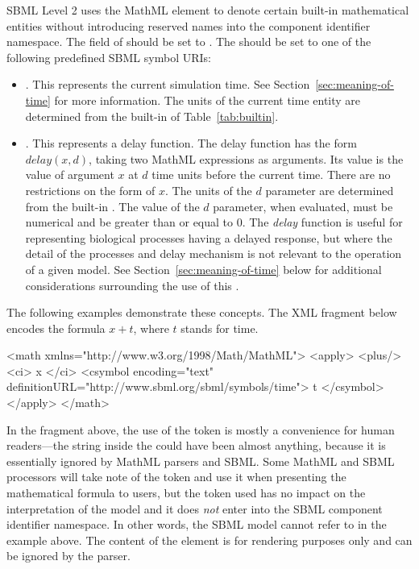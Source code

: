 SBML Level 2 uses the MathML  element to denote
certain built-in mathematical entities without introducing
reserved names into the component identifier namespace.  The
 field of  should be set to
.  The  should be set to one of the
following predefined SBML symbol URIs:
\begin{itemize}

\item {}.  This
  represents the current simulation time.  See
  Section~\ref{sec:meaning-of-time} for more information.  The
  units of the current time entity are determined from the
  built-in  of Table~\vref{tab:builtin}.

\item {}.  This
  represents a delay function.  The delay function has the form
  $delay(x, d)$, taking two MathML expressions as arguments.  Its
  value is the value of argument $x$ at $d$ time units before the
  current time.  There are no restrictions on the form of $x$.
  The units of the $d$ parameter are determined from the built-in
  .  The value of the $d$ parameter, when evaluated,
  must be numerical and be greater than or equal to 0.  The
  \emph{delay} function is useful for representing biological
  processes having a delayed response, but where the detail of the
  processes and delay mechanism is not relevant to the operation
  of a given model.  See Section~\ref{sec:meaning-of-time} below
  for additional considerations surrounding the use of this
  .

\end{itemize}

The following examples demonstrate these concepts.  The XML fragment below
encodes the formula $x + t$, where $t$ stands for time.

\begin{example}
<math xmlns="http://www.w3.org/1998/Math/MathML">
    <apply>
        <plus/>
        <ci> x </ci>
        <csymbol encoding="text" definitionURL="http://www.sbml.org/sbml/symbols/time">
            t
        </csymbol>
    </apply>
</math>
\end{example}

In the fragment above, the use of the token  is mostly a
convenience for human readers---the string inside the
 could have been almost anything, because it is
essentially ignored by MathML parsers and SBML.  Some MathML and
SBML processors will take note of the token and use it when
presenting the mathematical formula to users, but the token used
has no impact on the interpretation of the model and it does
\emph{not} enter into the SBML component identifier namespace.  In
other words, the SBML model cannot refer to  in the
example above.  The content of the  element is for
rendering purposes only and can be ignored by the parser.

